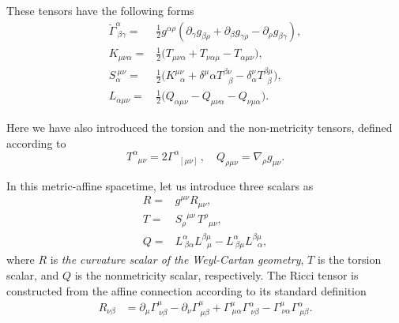 \documentclass[aps,superscriptaddress, showpacs,preprintnumbers, superscriptaddress, nofootinbibt,twocolumn]{revtex4}
\begin{document}
These  tensors  have the following forms
\begin{align}
\breve{\Gamma}^\alpha_{~\beta\gamma}=& \frac{1}{2} g^{\alpha\rho} \left( \partial _\gamma g_{\beta\rho} + \partial _\beta g_{\gamma\rho} - \partial _\rho g_{\beta\gamma} \right), \\
K_{\mu\nu\alpha}=&\frac{1}{2}\bigl(T_{\mu\nu\alpha}+T_{\nu\alpha\mu}-T_{\alpha\mu\nu}\bigr),\\
S_\alpha^{~\mu\nu}=&\frac12\bigl(K^{\mu\nu}_{~~~\alpha}+\delta^\mu\alpha T^{\beta\nu}_{~~~\beta}-\delta^\nu_\alpha T^{\beta\mu}_{~~\beta}\bigr),\\
L_{\alpha\mu\nu}=&\frac{1}{2}\bigl(Q_{\alpha\mu\nu}-Q_{\mu\nu\alpha}-Q_{\nu\mu\alpha}\bigr).
\end{align}

Here we have also introduced the torsion and the non-metricity tensors, defined according to
\begin{equation}
T_{\,\,\,\, \mu \nu}^{\alpha}=2 \Gamma_{\,\,\,\, [\mu \nu]}^{\alpha}\,, \quad Q_{\rho \mu \nu} = \nabla_{\rho} g_{\mu \nu}.
\end{equation}

In this metric-affine  spacetime, let us introduce three scalars as
\begin{align}
 R=&g^{\mu\nu}R_{\mu\nu},\label{1.3}\\
 T=&{S_\rho}^{\mu\nu}\,{T^\rho}_{\mu\nu},\label{1.5}\\
Q=& L^\alpha_{~\beta\alpha}L^{\beta\mu}_{~~~\mu}-L^\alpha_{~\beta\mu}L^{\beta\mu}_{~~~\alpha},
 \end{align}
 where $R$ is {\it the curvature scalar of the Weyl-Cartan geometry}, $T$ is the torsion scalar, and $Q$ is the nonmetricity  scalar, respectively. The Ricci tensor is constructed from the affine connection according to its standard definition
\begin{align}
R_{\nu\beta}&=\partial_\mu\Gamma^\mu_{~\nu\beta}-\partial_\nu\Gamma^\mu_{~\mu\beta}+\Gamma^\mu_{~\mu\alpha}\Gamma^\alpha_{~\nu\beta}-\Gamma^\mu_{~\nu\alpha}\Gamma^\alpha_{~\mu\beta}.
 \end{align}
\end{document}
